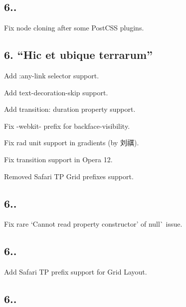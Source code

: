 \subsection*{6..}


\begin{DoxyItemize}
\item Fix node cloning after some Post\+C\+SS plugins.
\end{DoxyItemize}

\subsection*{6. “\+Hic et ubique terrarum”}


\begin{DoxyItemize}
\item Add {\ttfamily \+:any-\/link} selector support.
\item Add {\ttfamily text-\/decoration-\/skip} support.
\item Add {\ttfamily transition\+: duration property} support.
\item Fix {\ttfamily -\/webkit-\/} prefix for {\ttfamily backface-\/visibility}.
\item Fix {\ttfamily rad} unit support in gradients (by 刘祺).
\item Fix {\ttfamily transition} support in Opera 12.
\item Removed Safari TP Grid prefixes support.
\end{DoxyItemize}

\subsection*{6..}


\begin{DoxyItemize}
\item Fix rare `Cannot read property \textquotesingle{}constructor' of null\`{} issue.
\end{DoxyItemize}

\subsection*{6..}


\begin{DoxyItemize}
\item Add Safari TP prefix support for Grid Layout.
\end{DoxyItemize}

\subsection*{6..}


